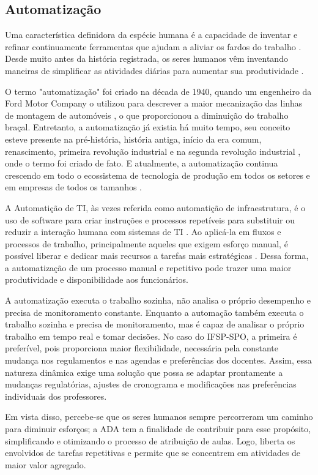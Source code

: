 \documentclass[12pt]{article}
\begin{document}
\subsection{Automatização}
\par Uma característica definidora da espécie humana é a capacidade de inventar e refinar continuamente ferramentas que ajudam a aliviar os fardos do trabalho \cite{brief1}. Desde muito antes da história registrada, os seres humanos vêm inventando maneiras de simplificar as atividades diárias para aumentar sua produtividade \cite{brief1}.
\par O termo "automatização" foi criado na década de 1940, quando um engenheiro da Ford Motor Company o utilizou para descrever a maior mecanização das linhas de montagem de automóveis \cite{OVH2}, o que proporcionou a diminuição do trabalho braçal. Entretanto, a automatização já existia há muito tempo, seu conceito esteve presente na pré-história, história antiga, início da era comum, renascimento, primeira revolução industrial e na segunda revolução industrial \cite{brief1}, onde o termo foi criado de fato. E atualmente, a automatização continua crescendo em todo o ecossistema de tecnologia de produção em todos os setores e em empresas de todos os tamanhos \cite{IMTS3}.
\par A Automatição de TI, às vezes referida como automatição de infraestrutura, é o uso de software para criar instruções e processos repetíveis para substituir ou reduzir a interação humana com sistemas de TI \cite{RH7}. Ao aplicá-la em fluxos e processos de trabalho, principalmente aqueles que exigem esforço manual, é possível liberar e dedicar mais recursos a tarefas mais estratégicas \cite{FU5}. Dessa forma, a automatização de um processo manual e repetitivo pode trazer uma maior produtividade e disponibilidade \cite{For6} aos funcionários.
\par A automatização executa o trabalho sozinha, não analisa o próprio desempenho e precisa de monitoramento constante. Enquanto a automação também executa o trabalho sozinha e precisa de monitoramento, mas é capaz de analisar o próprio trabalho em tempo real e tomar decisões. \cite{CIT8} No caso do IFSP-SPO, a primeira é preferível, pois proporciona maior flexibilidade, necessária pela constante mudança nos regulamentos e nas agendas e preferências dos docentes. Assim, essa natureza dinâmica exige uma solução que possa se adaptar prontamente a mudanças regulatórias, ajustes de cronograma e modificações nas preferências individuais dos professores.
\par Em vista disso, percebe-se que os seres humanos sempre percorreram um caminho para diminuir esforços; a ADA tem a finalidade de contribuir para esse propósito, simplificando e otimizando o processo de atribuição de aulas. Logo, liberta os envolvidos de tarefas repetitivas e permite que se concentrem em atividades de maior valor agregado. 
\end{document}
